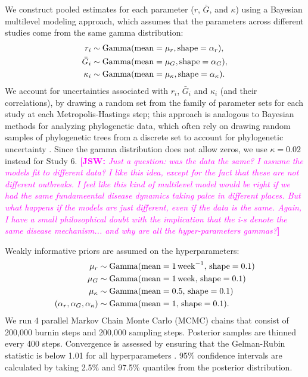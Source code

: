 \documentclass[12pt]{article}
\newcommand{\comment}[3]{\textcolor{#1}{\textbf{[#2: }\textsl{#3}\textbf{]}}}
\newcommand{\jsw}[1]{\comment{magenta}{JSW}{#1}}
\begin{document}
We construct pooled estimates for each parameter ($r$, $\bar G$, and $\kappa$) using a Bayesian multilevel modeling approach, which assumes that the parameters across different studies come from the same gamma distribution:
\begin{equation}
\begin{aligned}
r_i &\sim \mathrm{Gamma}(\mathrm{mean}=\mu_r, \mathrm{shape}=\alpha_r),\\
\bar{G}_i &\sim \mathrm{Gamma}(\mathrm{mean}=\mu_G, \mathrm{shape}=\alpha_G),\\
\kappa_i &\sim \mathrm{Gamma}(\mathrm{mean}=\mu_\kappa, \mathrm{shape}=\alpha_\kappa).\\
\end{aligned}
\end{equation}
We account for uncertainties associated with $r_i$, $\bar G_i$ and $\kappa_i$ (and their correlations), by drawing a random set from the family of parameter sets for each study at each Metropolis-Hastings step;
this approach is analogous to Bayesian methods for analyzing phylogenetic data, which often rely on drawing random samples of phylogenetic trees from a discrete set to account for phylogenetic uncertainty \citep{pagel2004bayesian,bedford2014integrating}.
Since the gamma distribution does not allow zeros, we use $\kappa =0.02$ instead for Study 6.
\jsw{Just a question: was the data the same?  I assume the models fit to different data?  I like this idea, except for the fact that these are not different outbreaks. I feel like this kind of multilevel model would be right if we had the same fundameental disease dynamics taking palce in different places. But what happens if the models are just different, even if the data is the same.  Again, I have a small philosophical doubt with the implication that the i-s denote the same disease mechanism... and why are all the hyper-parameters gammas?}

Weakly informative priors are assumed on the hyperparameters:
\begin{equation}
\begin{aligned}
\mu_r &\sim \mathrm{Gamma}(\mathrm{mean}=1\,\mathrm{week}^{-1},\,\mathrm{shape}=0.1)\\
\mu_G &\sim \mathrm{Gamma}(\mathrm{mean}=1\,\mathrm{week},\,\mathrm{shape}=0.1)\\
\mu_\kappa &\sim \mathrm{Gamma}(\mathrm{mean}=0.5,\,\mathrm{shape}=0.1)\\
(\alpha_r, \alpha_G, \alpha_\kappa) &\sim \mathrm{Gamma}(\mathrm{mean}=1,\,\mathrm{shape}=0.1).
\end{aligned}
\end{equation}
We run 4 parallel Markov Chain Monte Carlo (MCMC) chains that consist of 200,000 burnin steps and 200,000 sampling steps.
Posterior samples are thinned every 400 steps.
Convergence is assessed by ensuring that the Gelman-Rubin statistic is below 1.01 for all hyperparameters \citep{gelman1992inference}.
95\% confidence intervals are calculated by taking 2.5\% and 97.5\% quantiles from the posterior distribution.
\end{document}
